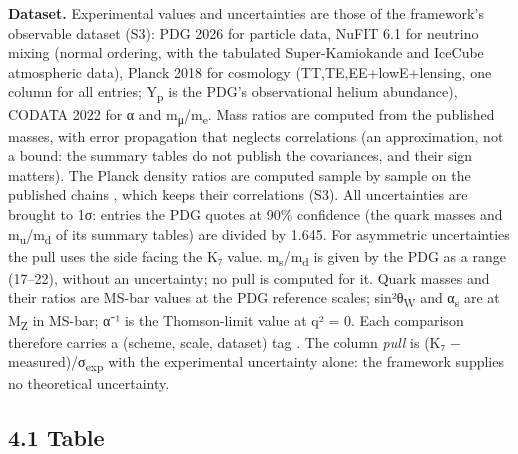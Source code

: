 \documentclass[11pt,a4paper]{article}
\begin{document}
\textbf{Dataset.} Experimental values and uncertainties are those of the framework's observable dataset (S3): PDG 2026 for particle data, NuFIT 6.1 for neutrino mixing (normal ordering, with the tabulated Super-Kamiokande and IceCube atmospheric data), Planck 2018 for cosmology (TT,TE,EE+lowE+lensing, one column for all entries; Y\textsubscript{p} is the PDG's observational helium abundance), CODATA 2022 for α and m\textsubscript{μ}/m\textsubscript{e}. Mass ratios are computed from the published masses, with error propagation that neglects correlations (an approximation, not a bound: the summary tables do not publish the covariances, and their sign matters). The Planck density ratios are computed sample by sample on the published chains \cite{3}, which keeps their correlations (S3). All uncertainties are brought to 1σ: entries the PDG quotes at 90\% confidence (the quark masses and m\textsubscript{u}/m\textsubscript{d} of its summary tables) are divided by 1.645. For asymmetric uncertainties the pull uses the side facing the K₇ value. m\textsubscript{s}/m\textsubscript{d} is given by the PDG as a range (17--22), without an uncertainty; no pull is computed for it. Quark masses and their ratios are MS-bar values at the PDG reference scales; sin²θ\textsubscript{W} and α\textsubscript{s} are at M\textsubscript{Z} in MS-bar; α⁻¹ is the Thomson-limit value at q² = 0. Each comparison therefore carries a (scheme, scale, dataset) tag \cite{1,3,27,50}. The column \emph{pull} is (K₇ − measured)/σ\textsubscript{exp} with the experimental uncertainty alone: the framework supplies no theoretical uncertainty.

\subsection{4.1 Table}\label{table}
\end{document}
